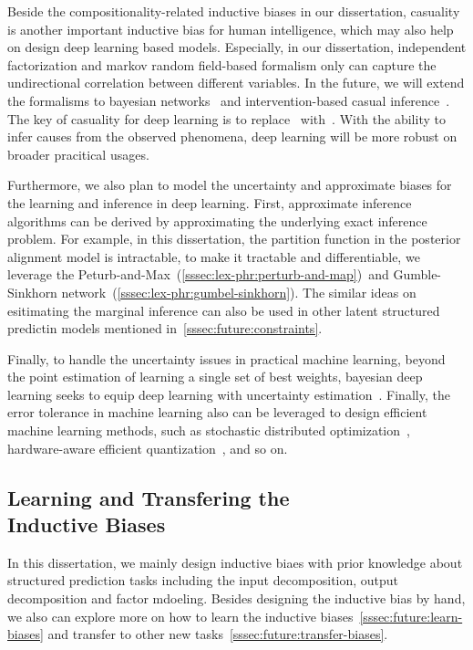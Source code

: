 Beside the compositionality-related inductive biases in our
dissertation, casuality is another important inductive bias for human
intelligence, which may also help on design deep learning based
models. Especially, in our dissertation, independent factorization and
markov random field-based formalism only can capture the undirectional
correlation between different variables. In the future, we will extend
the formalisms to bayesian
networks~\citep{wilson2020bayesian,wang2020survey} and
intervention-based casual
inference~\citep{pearl2010causal,glymour2016causal}. The key of
casuality for deep learning is to replace~ with~. With the ability to
infer causes from the observed phenomena, deep learning will be more
robust on broader pracitical usages.

Furthermore, we also plan to model the uncertainty and approximate
biases for the learning and inference in deep learning. First,
approximate inference algorithms can be derived by approximating the
underlying exact inference problem. For example, in this dissertation,
the partition function in the posterior alignment model is
intractable, to make it tractable and differentiable, we leverage the
Peturb-and-Max~(\autoref{sssec:lex-phr:perturb-and-map})~and
Gumble-Sinkhorn network~(\autoref{sssec:lex-phr:gumbel-sinkhorn}). The
similar ideas on esitimating the marginal inference can also be used
in other latent structured predictin models mentioned
in~\autoref{sssec:future:constraints}.

Finally, to handle the uncertainty issues in practical machine
learning, beyond the point estimation of learning a single set of best
weights, bayesian deep learning seeks to equip deep learning with
uncertainty estimation~\citep{wang2020survey}. Finally, the error
tolerance in machine learning also can be leveraged to design
efficient machine learning methods, such as stochastic distributed
optimization~\cite{assran2019stochastic}, hardware-aware efficient
quantization~\citep{huang2022sdq}, and so on.

\subsection[Learning and Transfering the Inductive Biases]{Learning and Transfering the \\Inductive Biases}
\label{ssec:future:bias-learn-transfer}
In this dissertation, we mainly design inductive biaes with prior knowledge
about structured prediction tasks including the input decomposition,
output decomposition and factor mdoeling. Besides designing the
inductive bias by hand, we also can explore more on how to learn the
inductive biases~\autoref{sssec:future:learn-biases} and transfer to
other new tasks~\autoref{sssec:future:transfer-biases}.

